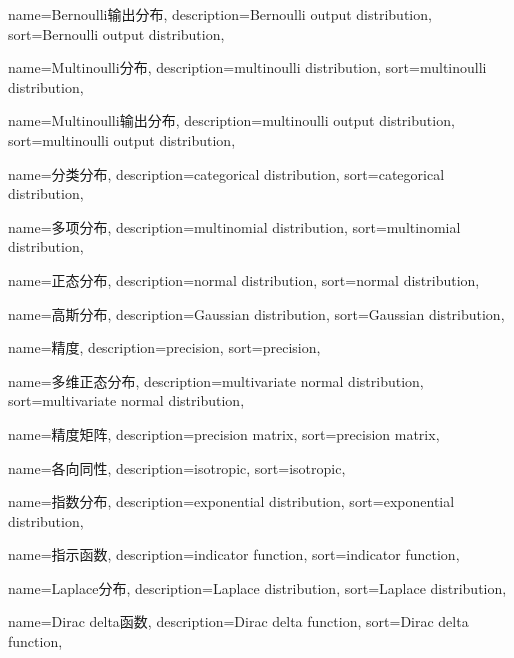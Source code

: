 {
  name=Bernoulli输出分布,
  description={Bernoulli output distribution},
  sort={Bernoulli output distribution},
}

{
  name=Multinoulli分布,
  description={multinoulli distribution},
  sort={multinoulli distribution},
}

{
  name=Multinoulli输出分布,
  description={multinoulli output distribution},
  sort={multinoulli output distribution},
}

{
  name=分类分布,
  description={categorical distribution},
  sort={categorical distribution},
}

{
  name=多项分布,
  description={multinomial distribution},
  sort={multinomial distribution},
}

{
  name=正态分布,
  description={normal distribution},
  sort={normal distribution},
}

{
  name=高斯分布,
  description={Gaussian distribution},
  sort={Gaussian distribution},
}

{
  name=精度,
  description={precision},
  sort={precision},
}

{
  name=多维正态分布,
  description={multivariate normal distribution},
  sort={multivariate normal distribution},
}

{
  name=精度矩阵,
  description={precision matrix},
  sort={precision matrix},
}

{
  name=各向同性,
  description={isotropic},
  sort={isotropic},
}

{
  name=指数分布,
  description={exponential distribution},
  sort={exponential distribution},
}

{
  name=指示函数,
  description={indicator function},
  sort={indicator function},
}

{
  name=Laplace分布,
  description={Laplace distribution},
  sort={Laplace distribution},
}

{
  name=Dirac delta函数,
  description={Dirac delta function},
  sort={Dirac delta function},
}

